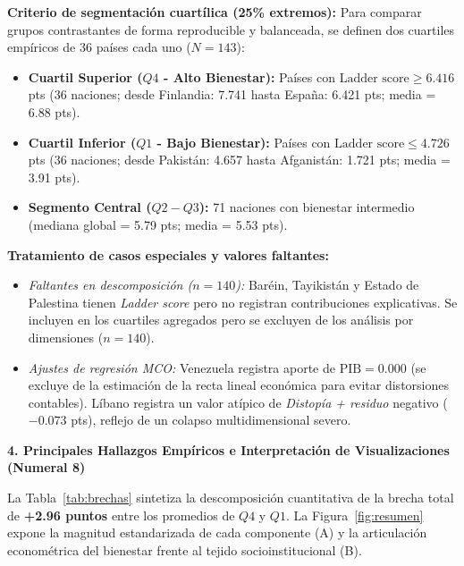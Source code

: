 \documentclass[9pt,a4paper]{article}
\newcommand{\customsection}[1]{%
  \vspace{0.2em}%
  {\small\bfseries\color{whrmagenta}#1}%
  \vspace{0.05em}\par%
}
\begin{document}
\vspace{-0.3em}
\textbf{Criterio de segmentación cuartílica (25\% extremos):} Para comparar grupos contrastantes de forma reproducible y balanceada, se definen dos cuartiles empíricos de 36 países cada uno ($N=143$):
\begin{itemize}
    \item \textbf{Cuartil Superior ($Q4$ - Alto Bienestar):} Países con $\text{Ladder score} \ge 6.416$ pts (36 naciones; desde Finlandia: 7.741 hasta España: 6.421 pts; media = 6.88 pts).
    \item \textbf{Cuartil Inferior ($Q1$ - Bajo Bienestar):} Países con $\text{Ladder score} \le 4.726$ pts (36 naciones; desde Pakistán: 4.657 hasta Afganistán: 1.721 pts; media = 3.91 pts).
    \item \textbf{Segmento Central ($Q2-Q3$):} 71 naciones con bienestar intermedio (mediana global = 5.79 pts; media = 5.53 pts).
\end{itemize}

\textbf{Tratamiento de casos especiales y valores faltantes:}
\begin{itemize}
    \item \textit{Faltantes en descomposición ($n = 140$):} Baréin, Tayikistán y Estado de Palestina tienen \textit{Ladder score} pero no registran contribuciones explicativas. Se incluyen en los cuartiles agregados pero se excluyen de los análisis por dimensiones ($n = 140$).
    \item \textit{Ajustes de regresión MCO:} Venezuela registra aporte de $\text{PIB} = 0.000$ (se excluye de la estimación de la recta lineal económica para evitar distorsiones contables). Líbano registra un valor atípico de \textit{Distopía + residuo} negativo ($-0.073$ pts), reflejo de un colapso multidimensional severo.
\end{itemize}

\clearpage


\customsection{4. Principales Hallazgos Empíricos e Interpretación de Visualizaciones (Numeral 8)}

La Tabla~\ref{tab:brechas} sintetiza la descomposición cuantitativa de la brecha total de \textbf{+2.96 puntos} entre los promedios de $Q4$ y $Q1$. La Figura~\ref{fig:resumen} expone la magnitud estandarizada de cada componente (A) y la articulación econométrica del bienestar frente al tejido socioinstitucional (B).
\end{document}
